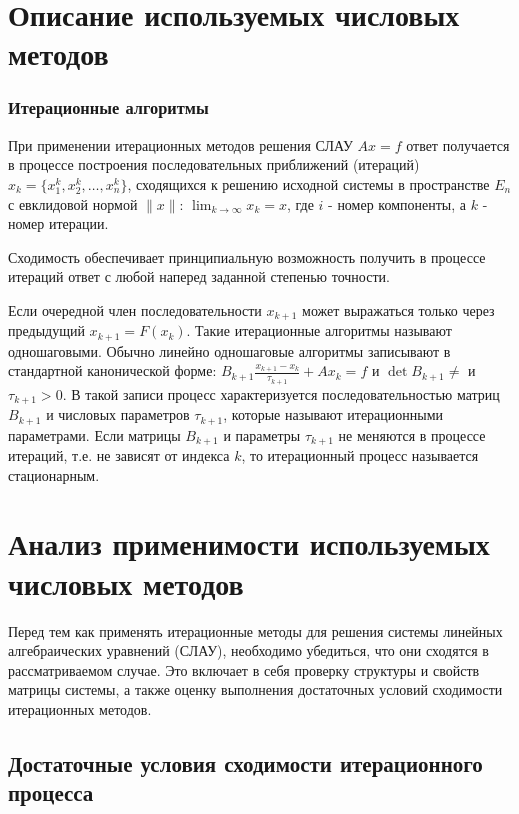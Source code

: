\documentclass[a4paper, fleqn]{report}
\begin{document}
\chapter{Описание используемых числовых методов}

\subsection*{Итерационные алгоритмы}

При применении итерационных методов решения СЛАУ $Ax = f$ ответ получается в процессе построения последовательных приближений (итераций) $x_k = \{x_1^k, x_2^k, \dots, x_n^k\}$, сходящихся к решению исходной системы в пространстве $E_n$ с евклидовой нормой $\|x\|$: $\lim_{k \to \infty} x_k = x$, где $i$ - номер компоненты, а $k$ - номер итерации.

Сходимость обеспечивает принципиальную возможность получить в процессе итераций ответ с любой наперед заданной степенью точности. 

Если очередной член последовательности $x_{k+1}$ может выражаться только через предыдущий $x_{k+1} = F(x_k) $. Такие итерационные алгоритмы называют одношаговыми. Обычно линейно одношаговые алгоритмы записывают в стандартной канонической форме:
$B_{k+1} \frac{x_{k+1} - x_k}{\tau_{k+1}} + Ax_k = f$ и $\det B_{k+1} \neq$ и $\tau_{k+1} > 0$. В такой записи процесс характеризуется последовательностью матриц $B_{k+1}$ и числовых параметров $\tau_{k+1}$, которые называют итерационными параметрами. Если матрицы $B_{k+1}$ и параметры $\tau_{k+1}$ не меняются в процессе итераций, т.е. не зависят от индекса $k$, то итерационный процесс называется стационарным.

\chapter{Анализ применимости используемых числовых методов}

Перед тем как применять итерационные методы для решения системы линейных алгебраических уравнений (СЛАУ), необходимо убедиться, что они сходятся в рассматриваемом случае. Это включает в себя проверку структуры и свойств матрицы системы, а также оценку выполнения достаточных условий сходимости итерационных методов.

\section*{Достаточные условия сходимости итерационного процесса}
\end{document}
